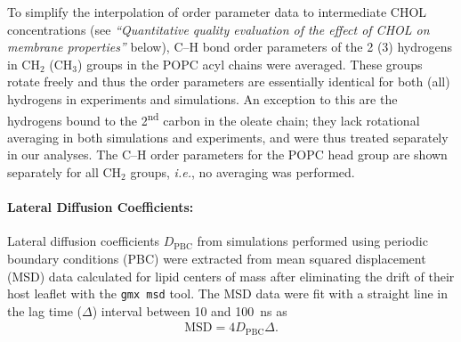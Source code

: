 \documentclass[journal=jctcce]{achemso}
\begin{document}
To simplify the interpolation of order parameter data to intermediate CHOL concentrations (see \textit{``Quantitative quality evaluation of the effect of CHOL on membrane properties''} below), C--H bond order parameters of the 2 (3) hydrogens in CH$_2$ (CH$_3$) groups in the POPC acyl chains were averaged. These groups rotate freely and thus the order parameters are essentially identical for both (all) hydrogens in experiments and simulations. An exception to this are the hydrogens bound to the 2\textsuperscript{nd} carbon in the oleate chain; they lack rotational averaging in both simulations and experiments, and were thus treated separately in our analyses. The C--H order parameters for the POPC head group are shown separately for all CH$_2$ groups, \textit{i.e.}, no averaging was performed. 

\paragraph{Lateral Diffusion Coefficients:} Lateral diffusion coefficients $D_\mathrm{PBC}$ from simulations performed using periodic boundary conditions (PBC) were extracted from mean squared displacement (MSD) data calculated for lipid centers of mass after eliminating the drift of their host leaflet with the \texttt{gmx msd} tool. The MSD data were fit with a straight line in the lag time ($\Delta$) interval between 10 and 100~ns as
%
\begin{align}
	\mathrm{MSD}=4D_\mathrm{PBC}\Delta.
\end{align}
\end{document}
